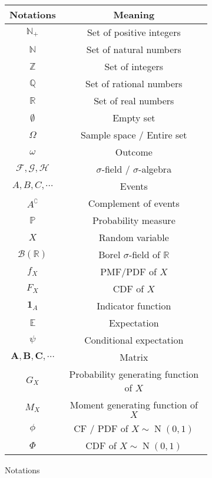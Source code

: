 \documentclass{huhtakm-template-book}
\newcommand{\prob}{\mathbb{P}}
\DeclareMathOperator{\N}{N}
\begin{document}
\begin{figure}[h]
    \begin{subfigure}{0.45\textwidth}
        \centering
        \begin{tabular}{cc}
            Notations & Meaning\\
            \hline
            $\mathbb{N}_{+}$ & Set of positive integers\\
            $\mathbb{N}$ & Set of natural numbers\\
            $\mathbb{Z}$ & Set of integers\\
            $\mathbb{Q}$ & Set of rational numbers\\
            $\mathbb{R}$ & Set of real numbers\\
            $\emptyset$ & Empty set\\
            $\Omega$ & Sample space / Entire set\\
            $\omega$ & Outcome\\
            $\mathcal{F},\mathcal{G},\mathcal{H}$ & $\sigma$-field / $\sigma$-algebra\\
            $A,B,C,\cdots$ & Events\\
            $A^{\complement}$ & Complement of events\\
            $\prob$ & Probability measure\\
            $X$ & Random variable\\
            $\mathcal{B}(\mathbb{R})$ & Borel $\sigma$-field of $\mathbb{R}$ \\
            $f_{X}$ & PMF/PDF of $X$\\
            $F_{X}$ & CDF of $X$\\
            $\mathbf{1}_{A}$ & Indicator function\\
            $\mathbb{E}$ & Expectation\\
            $\psi$ & Conditional expectation\\
            $\mathbf{A},\mathbf{B},\mathbf{C},\cdots$ & Matrix\\
            $G_{X}$ & Probability generating function of $X$\\
            $M_{X}$ & Moment generating function of $X$\\
            $\phi$ & CF / PDF of $X\sim\N(0,1)$\\
            $\Phi$ & CDF of $X\sim\N(0,1)$
        \end{tabular}
        \caption{Notations}
    \end{subfigure}
    \begin{subfigure}{0.45\textwidth}

\end{subfigure}
\end{figure}
\end{document}
